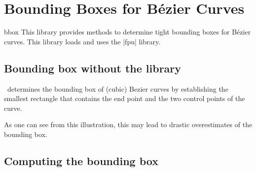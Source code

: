 %
%
%

\section{Bounding Boxes for B\'ezier Curves}


\begin{pgflibrary}{bbox}
    This library provides methods to determine tight bounding boxes for
    B\'ezier curves. This library loads and uses the
	|fpu| library.
\end{pgflibrary}

\subsection{Bounding box without the library}

\tikzname\ determines the bounding box of (cubic) Bezier curves by establishing the
smallest rectangle that contains the end point and the two control points of the
curve.

\begin{codeexample}[width=5cm]
\end{codeexample}

As one can see from this illustration, this may lead to drastic overestimates of
the bounding box.

\subsection{Computing the bounding box}

